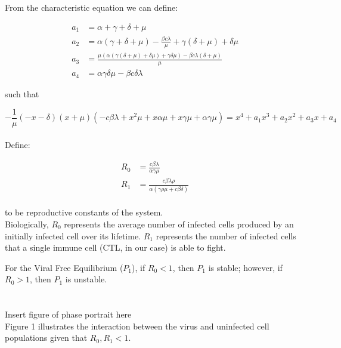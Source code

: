 \documentclass{article}
\begin{document}
From the characteristic equation we can define:

\begin{equation}
	\begin{split}
		a_{1} &= \alpha + \gamma + \delta + \mu \\
		a_{2} &= \alpha (\gamma + \delta + \mu) - \frac{\beta c \lambda}{\mu} + \gamma (\delta + \mu) + \delta \mu \\
		a_{3} &= \frac{\mu (\alpha (\gamma (\delta + \mu) + \delta \mu) + \gamma \delta \mu ) - \beta c \lambda (\delta + \mu)}{\mu} \\
		a_{4} &= \alpha \gamma \delta \mu - \beta c \delta \lambda
	\end{split}
\end{equation}

such that

\begin{equation}
	- \frac{1}{\mu}(-x - \delta)(x + \mu)(-c \beta \lambda + x^2 \mu + x \alpha \mu + x\gamma \mu + \alpha \gamma \mu) = x^4 + a_{1}x^3 + a_{2}x^2 + a_{3}x + a_{4}
\end{equation}\\

Define:

\begin{equation}
	\begin{split}
		R_{0} &= \frac{c \beta \lambda}{\alpha \gamma \mu} \\
		R_{1} &= \frac{c \beta \lambda \rho}{\alpha (\gamma \rho \mu + c \beta \delta)}
	\end{split}
\end{equation}\\

to be reproductive constants of the system.\\
Biologically, $R_{0}$ represents the average number of infected cells produced by an initially infected cell over its lifetime. $R_{1}$ represents the number of infected cells that a single immune cell (CTL, in our case) is able to fight.

For the Viral Free Equilibrium ($P_{1}$), if $R_{0} < 1$, then $P_{1}$ is stable; however, if $R_{0} > 1$, then $P_{1}$ is unstable.\\
\\
\\Insert figure of phase portrait here
\\ Figure 1 illustrates the interaction between the virus and uninfected cell populations given that $R_{0}, R_{1} < 1$.
\end{document}
